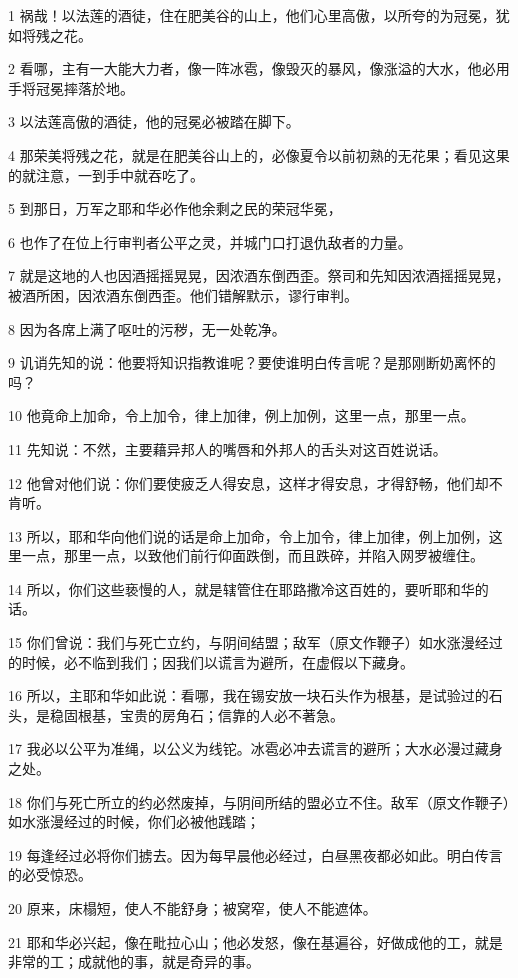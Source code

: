 \par 1 祸哉！以法莲的酒徒，住在肥美谷的山上，他们心里高傲，以所夸的为冠冕，犹如将残之花。
\par 2 看哪，主有一大能大力者，像一阵冰雹，像毁灭的暴风，像涨溢的大水，他必用手将冠冕摔落於地。
\par 3 以法莲高傲的酒徒，他的冠冕必被踏在脚下。
\par 4 那荣美将残之花，就是在肥美谷山上的，必像夏令以前初熟的无花果；看见这果的就注意，一到手中就吞吃了。
\par 5 到那日，万军之耶和华必作他余剩之民的荣冠华冕，
\par 6 也作了在位上行审判者公平之灵，并城门口打退仇敌者的力量。
\par 7 就是这地的人也因酒摇摇晃晃，因浓酒东倒西歪。祭司和先知因浓酒摇摇晃晃，被酒所困，因浓酒东倒西歪。他们错解默示，谬行审判。
\par 8 因为各席上满了呕吐的污秽，无一处乾净。
\par 9 讥诮先知的说：他要将知识指教谁呢？要使谁明白传言呢？是那刚断奶离怀的吗？
\par 10 他竟命上加命，令上加令，律上加律，例上加例，这里一点，那里一点。
\par 11 先知说：不然，主要藉异邦人的嘴唇和外邦人的舌头对这百姓说话。
\par 12 他曾对他们说：你们要使疲乏人得安息，这样才得安息，才得舒畅，他们却不肯听。
\par 13 所以，耶和华向他们说的话是命上加命，令上加令，律上加律，例上加例，这里一点，那里一点，以致他们前行仰面跌倒，而且跌碎，并陷入网罗被缠住。
\par 14 所以，你们这些亵慢的人，就是辖管住在耶路撒冷这百姓的，要听耶和华的话。
\par 15 你们曾说：我们与死亡立约，与阴间结盟；敌军（原文作鞭子）如水涨漫经过的时候，必不临到我们；因我们以谎言为避所，在虚假以下藏身。
\par 16 所以，主耶和华如此说：看哪，我在锡安放一块石头作为根基，是试验过的石头，是稳固根基，宝贵的房角石；信靠的人必不著急。
\par 17 我必以公平为准绳，以公义为线铊。冰雹必冲去谎言的避所；大水必漫过藏身之处。
\par 18 你们与死亡所立的约必然废掉，与阴间所结的盟必立不住。敌军（原文作鞭子）如水涨漫经过的时候，你们必被他践踏；
\par 19 每逢经过必将你们掳去。因为每早晨他必经过，白昼黑夜都必如此。明白传言的必受惊恐。
\par 20 原来，床榻短，使人不能舒身；被窝窄，使人不能遮体。
\par 21 耶和华必兴起，像在毗拉心山；他必发怒，像在基遍谷，好做成他的工，就是非常的工；成就他的事，就是奇异的事。
